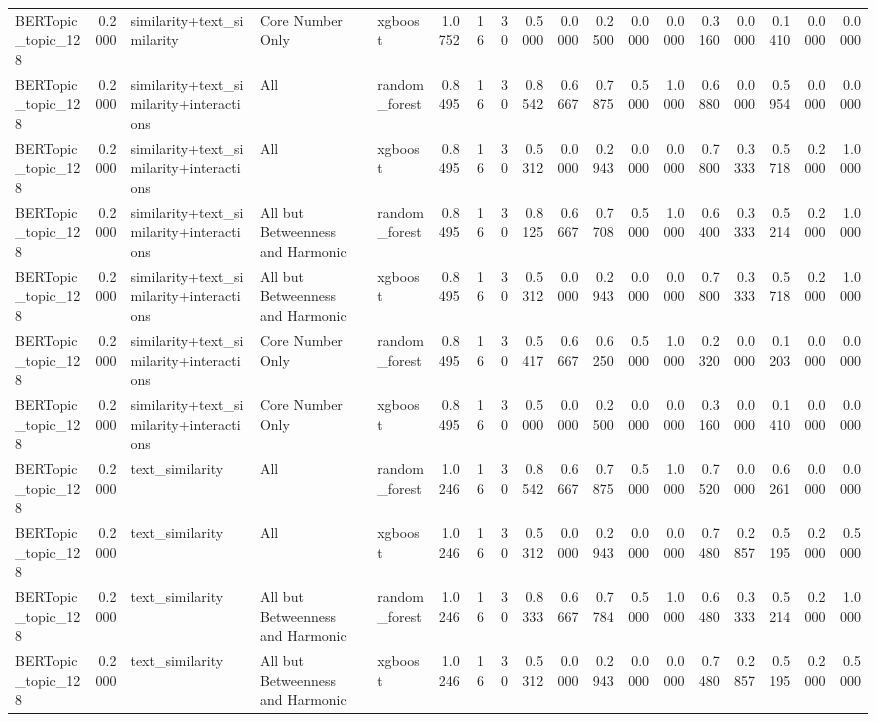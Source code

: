 \begin{tabular}{lrlllrrrrrrrrrrrrr}
BERTopic_topic_128 & 0.2000 & similarity+text_similarity & Core Number Only & xgboost & 1.0752 & 16 & 30 & 0.5000 & 0.0000 & 0.2500 & 0.0000 & 0.0000 & 0.3160 & 0.0000 & 0.1410 & 0.0000 & 0.0000 \\
BERTopic_topic_128 & 0.2000 & similarity+text_similarity+interactions & All & random_forest & 0.8495 & 16 & 30 & 0.8542 & 0.6667 & 0.7875 & 0.5000 & 1.0000 & 0.6880 & 0.0000 & 0.5954 & 0.0000 & 0.0000 \\
BERTopic_topic_128 & 0.2000 & similarity+text_similarity+interactions & All & xgboost & 0.8495 & 16 & 30 & 0.5312 & 0.0000 & 0.2943 & 0.0000 & 0.0000 & 0.7800 & 0.3333 & 0.5718 & 0.2000 & 1.0000 \\
BERTopic_topic_128 & 0.2000 & similarity+text_similarity+interactions & All but Betweenness and Harmonic & random_forest & 0.8495 & 16 & 30 & 0.8125 & 0.6667 & 0.7708 & 0.5000 & 1.0000 & 0.6400 & 0.3333 & 0.5214 & 0.2000 & 1.0000 \\
BERTopic_topic_128 & 0.2000 & similarity+text_similarity+interactions & All but Betweenness and Harmonic & xgboost & 0.8495 & 16 & 30 & 0.5312 & 0.0000 & 0.2943 & 0.0000 & 0.0000 & 0.7800 & 0.3333 & 0.5718 & 0.2000 & 1.0000 \\
BERTopic_topic_128 & 0.2000 & similarity+text_similarity+interactions & Core Number Only & random_forest & 0.8495 & 16 & 30 & 0.5417 & 0.6667 & 0.6250 & 0.5000 & 1.0000 & 0.2320 & 0.0000 & 0.1203 & 0.0000 & 0.0000 \\
BERTopic_topic_128 & 0.2000 & similarity+text_similarity+interactions & Core Number Only & xgboost & 0.8495 & 16 & 30 & 0.5000 & 0.0000 & 0.2500 & 0.0000 & 0.0000 & 0.3160 & 0.0000 & 0.1410 & 0.0000 & 0.0000 \\
BERTopic_topic_128 & 0.2000 & text_similarity & All & random_forest & 1.0246 & 16 & 30 & 0.8542 & 0.6667 & 0.7875 & 0.5000 & 1.0000 & 0.7520 & 0.0000 & 0.6261 & 0.0000 & 0.0000 \\
BERTopic_topic_128 & 0.2000 & text_similarity & All & xgboost & 1.0246 & 16 & 30 & 0.5312 & 0.0000 & 0.2943 & 0.0000 & 0.0000 & 0.7480 & 0.2857 & 0.5195 & 0.2000 & 0.5000 \\
BERTopic_topic_128 & 0.2000 & text_similarity & All but Betweenness and Harmonic & random_forest & 1.0246 & 16 & 30 & 0.8333 & 0.6667 & 0.7784 & 0.5000 & 1.0000 & 0.6480 & 0.3333 & 0.5214 & 0.2000 & 1.0000 \\
BERTopic_topic_128 & 0.2000 & text_similarity & All but Betweenness and Harmonic & xgboost & 1.0246 & 16 & 30 & 0.5312 & 0.0000 & 0.2943 & 0.0000 & 0.0000 & 0.7480 & 0.2857 & 0.5195 & 0.2000 & 0.5000 \\

\end{tabular}
